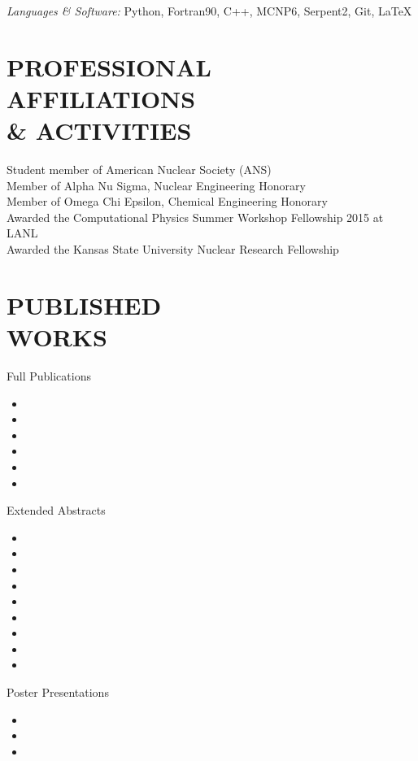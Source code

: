 \documentclass[margin, 10pt]{res} %
\begin{document}
\begin{resume}
{\sl Languages \& Software:}
Python, Fortran90, C++, MCNP6, Serpent2, Git, \LaTeX  \\

\section{PROFESSIONAL \\ AFFILIATIONS  \\ \& ACTIVITIES}

Student member of American Nuclear Society (ANS) \\
Member of Alpha Nu Sigma, Nuclear Engineering Honorary \\
Member of Omega Chi Epsilon, Chemical Engineering Honorary\\
Awarded the Computational Physics Summer Workshop Fellowship 2015 at LANL\\
Awarded the Kansas State University Nuclear Research Fellowship

\section{PUBLISHED \\ WORKS}
Full Publications
\begin{itemize}
\item {}
\item {}
\item {}
\item {}
\item {}
\item {}
\end{itemize}
Extended Abstracts
\begin{itemize}
\item {}
\item {}
\item {}
\item {}
\item {}
\item {}
\item {}
\item {}
\item {}
\end{itemize}
Poster Presentations
\begin{itemize}
\item {}
\item {}
\item {}
\end{itemize}

\end{resume}
\end{document}
